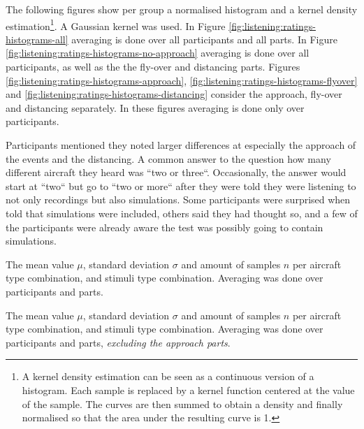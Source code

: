 \documentclass[10pt,twocolumn]{article}
\begin{document}
The following figures show per group a normalised histogram and a kernel density estimation\footnote{ A kernel density estimation can be seen as a continuous version
of a histogram. Each sample is replaced by a kernel function centered at the
value of the sample. The curves are then summed to obtain a density and finally
normalised so that the area under the resulting curve is 1. }. A Gaussian kernel
was used.
In Figure \ref{fig:listening:ratings-histograms-all} averaging is done over all participants and all parts.
In Figure \ref{fig:listening:ratings-histograms-no-approach} averaging is done over all participants, as well as the the fly-over and distancing parts.
Figures \ref{fig:listening:ratings-histograms-approach}, \ref{fig:listening:ratings-histograms-flyover} and \ref{fig:listening:ratings-histograms-distancing}
consider the approach, fly-over and distancing separately. In these figures averaging is done only over participants.

Participants mentioned they noted larger differences at especially the approach of the events and the distancing.
A common answer to the question how many different aircraft they heard was ``two or three``.
Occasionally, the answer would start at ``two`` but go to ``two or more`` after they
were told they were listening to not only recordings but also simulations. Some
participants were surprised when told that simulations were included,
others said they had thought so, and a few of the participants were already
aware the test was possibly going to contain simulations.

\begin{table}[H]
  \centering
  \caption{The mean value $\mu$, standard deviation $\sigma$ and amount of samples $n$ per aircraft type combination, and stimuli type combination. Averaging was done over participants and parts.}
  \label{table:listening:results:analysis-with-approach}
  
\end{table}

\begin{table}[H]
  \centering
  \caption{The mean value $\mu$, standard deviation $\sigma$ and amount of samples $n$ per aircraft type combination, and stimuli type combination. Averaging was done over participants and parts, \emph{excluding the approach parts}.}
  \label{table:listening:results:analysis}
  
\end{table}
\end{document}
